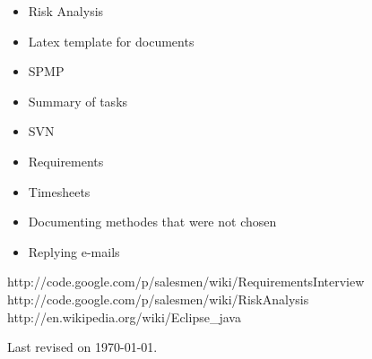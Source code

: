 \documentclass[a4paper, 12pt]{article}
\begin{document}
	\begin{itemize}

			
		\item Risk Analysis
		
		\item Latex template for documents
		
		\item SPMP
		
		\item Summary of tasks
		
		\item SVN
		
		\item Requirements
		
		\item Timesheets
		
		\item Documenting methodes that were not chosen
		
		\item Replying e-mails
		
	\end{itemize}
	
	
	\begin{thebibliography}{99}
		
		http://code.google.com/p/salesmen/wiki/RequirementsInterview
		http://code.google.com/p/salesmen/wiki/RiskAnalysis
		http://en.wikipedia.org/wiki/Eclipse\_{}java
		
	\end{thebibliography}	
	
	\begin{center}
	 	Last revised on \today.
	\end{center}
	
	
\end{document}
